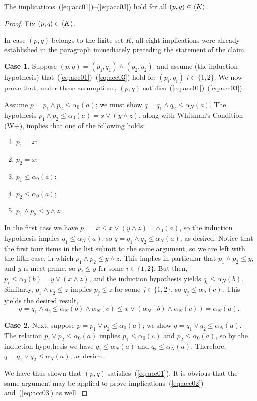 \begin{claim}\label{claim:main_alpha}
  The implications~(\ref{eq:acc01})--(\ref{eq:acc03}) hold for all $(p,q) \in \langle K\rangle$.
  \end{claim}
  \begin{proof}
    Fix $(p, q) \in  \langle K\rangle$. 
  
    In case $(p,q)$ belongs to the finite set $K$, all eight implications were already 
    established in the paragraph immediately preceding the statement of the claim.
    
    \medskip
    \noindent \textbf{Case 1.}
    Suppose $(p,q) = (p_1, q_1) \wedge (p_2, q_2)$, and assume (the induction hypothesis) 
    that~(\ref{eq:acc01})--(\ref{eq:acc03}) hold for
    $(p_i,q_i)$ $i\in \{1,2\}$.
    We now prove that, under these assumptions, $(p,q)$ 
    satisfies~(\ref{eq:acc01})--(\ref{eq:acc03}).
    
    Assume $p = p_1\wedge p_2 \leq \alpha_0(a)$; we must show 
    $q=q_1\wedge q_2 \leq \alpha_N(a)$.
    The hypothesis $p_1\wedge p_2 \leq \alpha_0(a) = x\vee (y \wedge z)$, along with 
    Whitman's Condition (W+), implies that one of the following holds:
    \begin{enumerate}
      \item   $p_1=x$;  
      \item   $p_2=x$;  
      \item   $p_1\leq \alpha_0(a)$;  
      \item   $p_2\leq \alpha_0(a)$;  
      \item   $p_1\wedge p_2 \leq y \wedge z$;  
    \end{enumerate}
    In the first case we have $p_1 = x \leq x \vee (y \wedge z) = \alpha_0(a)$, so
    the induction hypothesis implies $q_1\leq \alpha_N(a)$, so 
    $q = q_1\wedge q_2\leq \alpha_N(a)$, as desired.  
    Notice that the first four items in the list submit to the same argument,
    so we are left with the fifth case, 
    in which $p_1\wedge p_2 \leq y \wedge z$. 
    This implies in particular that $p_1\wedge p_2 \leq y$, and $y$ is meet prime, so 
    $p_i\leq y$ for some $i\in \{1,2\}$.  
    But then, $p_i \leq \alpha_0(b) = y\vee (x\wedge z)$, and the induction hypothesis
    yields $q_i \leq \alpha_N(b)$.
    Similarly, $p_1\wedge p_2 \leq z$ implies 
    $p_j\leq z$ for some $j\in \{1,2\}$, so $q_j \leq \alpha_N(c)$.
    This yields the desired result,
    \[
    q = q_1\wedge q_2 \leq \alpha_N(b) \wedge \alpha_N(c) 
    \leq x \vee (\alpha_N(b)\wedge \alpha_N(c)) = \alpha_N(a).
    \] 
  
    \medskip
    \noindent \textbf{Case 2.}
    Next, suppose $p = p_1\vee p_2 \leq \alpha_0(a)$; we show 
    $q = q_1 \vee q_2 \leq \alpha_N(a)$. 
    The relation $p_1\vee p_2 \leq \alpha_0(a)$ implies 
    $p_1\leq \alpha_0(a)$ and $p_2\leq \alpha_0(a)$, 
    so by the induction hypothesis we have 
    $q_1\leq \alpha_N(a)$ and $q_2\leq \alpha_N(a)$.  
    Therefore, $q = q_1 \vee q_2 \leq \alpha_N(a)$, as desired.

    We have thus shown that $(p,q)$ satisfies~(\ref{eq:acc01}).
    It is obvious that the same argument may be applied to prove 
    implications~(\ref{eq:acc02}) and~(\ref{eq:acc03}) as well.
  \end{proof}

